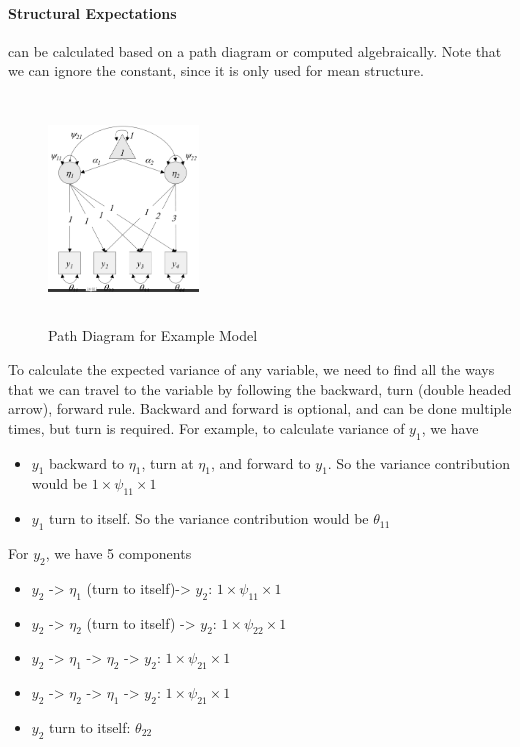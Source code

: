 \paragraph{Structural Expectations} can be calculated based on a path diagram or computed algebraically. Note that we can ignore the constant, since it is only used for mean structure. 
    \begin{figure}[ht]
        \centering
        \includegraphics[width = 4cm, height = 6cm]{images/002_sem_expectation_model.png}
        \caption{Path Diagram for Example Model}
        \label{fig:sem_path_expec_mod}
    \end{figure}
To calculate the expected variance of any variable, we need to find all the ways that we can travel to the variable by following the backward, turn (double headed arrow), forward rule. Backward and forward is optional, and can be done multiple times, but turn is required. For example, to calculate variance of $y_1$, we have 
    \begin{itemize}
        \item $y_1$ backward to $\eta_1$, turn at $\eta_1$, and forward to $y_1$. So the variance contribution would be $1 \times \psi_{11} \times 1$
        \item $y_1$ turn to itself. So the variance contribution would be $\theta_{11}$
    \end{itemize}
For $y_2$, we have 5 components
    \begin{itemize}
        \item $y_2$ -> $\eta_1$ (turn to itself)-> $y_2$: $1 \times \psi_{11} \times 1$
        \item $y_2$ -> $\eta_2$ (turn to itself) -> $y_2$: $1 \times \psi_{22} \times 1$
        \item $y_2$ -> $\eta_1$ -> $\eta_2$ -> $y_2$: $1 \times \psi_{21} \times 1$
        \item $y_2$ -> $\eta_2$ -> $\eta_1$ -> $y_2$: $1 \times \psi_{21} \times 1$
        \item $y_2$ turn to itself: $\theta_{22}$
    \end{itemize}
